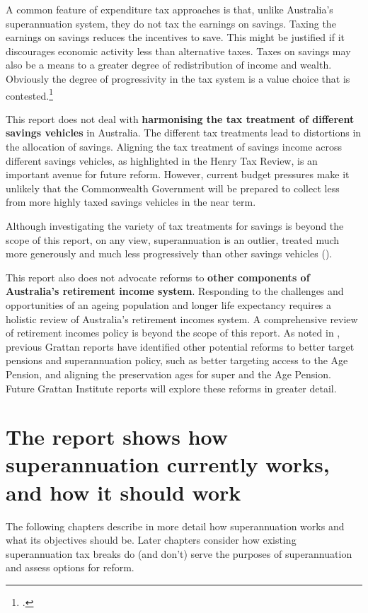 \documentclass{grattanAlpha}
\begin{document}
A common feature of expenditure tax approaches is that, unlike Australia’s superannuation system, they do not tax the earnings on savings. Taxing the earnings on savings reduces the incentives to save. This might be justified if it discourages economic activity less than alternative taxes. Taxes on savings may also be a means to a greater degree of redistribution of income and wealth. Obviously the degree of progressivity in the tax system is a value choice that is contested.\footcite{Davidson2015} 

This report does not deal with \textbf{harmonising the tax treatment of different savings vehicles} in Australia. The different tax treatments lead to distortions in the allocation of savings.  Aligning the tax treatment of savings income across different savings vehicles, as highlighted in the Henry Tax Review, is an important avenue for future reform. However, current budget pressures make it unlikely that the Commonwealth Government will be prepared to collect less from more highly taxed savings vehicles in the near term.

Although investigating the variety of tax treatments for savings is beyond the scope of this report, on any view, superannuation is an outlier, treated much more generously and much less progressively than other savings vehicles ().

This report also does not advocate reforms to \textbf{other components of Australia’s retirement income system}. Responding to the challenges and opportunities of an ageing population and longer life expectancy requires a holistic review of Australia’s retirement incomes system. A comprehensive review of retirement incomes policy is beyond the scope of this report. As noted in , previous Grattan reports have identified other potential reforms to better target pensions and superannuation policy, such as better targeting access to the Age Pension, and aligning the preservation ages for super and the Age Pension. Future Grattan Institute reports will explore these reforms in greater detail. 

\section{The report shows how superannuation currently works, and how it should work}
The following chapters describe in more detail how superannuation works and what its objectives should be. Later chapters consider how existing superannuation tax breaks do (and don’t) serve the purposes of superannuation and assess options for reform.
\end{document}
